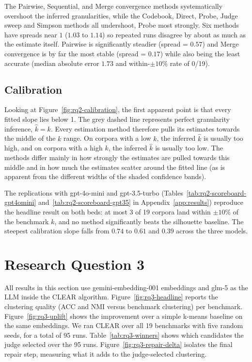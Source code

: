 \documentclass[11pt,a4paper,oneside]{report}
\begin{document}
The Pairwise, Sequential, and Merge convergence methods systematically overshoot the inferred granularities, while the Codebook, Direct, Probe, Judge sweep and Simpson methods all undershoot, Probe most strongly. Six methods have spreads near $1$ ($1.03$ to $1.14$) so repeated runs disagree by about as much as the estimate itself. Pairwise is significantly steadier (spread = $0.57$) and Merge convergence is by far the most stable (spread = $0.17$) while also being the least accurate (median absolute error $1.73$ and within-$\pm 10\%$ rate of 0/19).

\subsection{Calibration}

Looking at Figure~\ref{fig:rq2-calibration}, the first apparent point is that every fitted slope lies below 1. The grey dashed line represents perfect granularity inference, $\hat{k} = k$. Every estimation method therefore pulls its estimates towards the middle of the $k$ range. On corpora with a low $k$, the inferred $\hat{k}$ is usually too high, and on corpora with a high $k$, the inferred $\hat{k}$ is usually too low. The methods differ mainly in how strongly the estimates are pulled towards this middle and in how much the estimates scatter around the fitted line (as is apparent from the different widths of the shaded confidence bands).

The replications with {\small\ttfamily gpt-4o-mini} and
{\small\ttfamily gpt-3.5-turbo}
(Tables~\ref{tab:rq2-scoreboard-gpt4omini}
and~\ref{tab:rq2-scoreboard-gpt35} in Appendix~\ref{app:results})
reproduce the headline result on both beds: at most 3 of 19 corpora
land within $\pm 10\%$ of the benchmark $k$, and no method
significantly beats the silhouette baseline. The steepest calibration
slope falls from $0.74$ to $0.61$ and $0.39$ across the three models.

\section{Research Question 3}\label{sec:results-rq3}

All results in this section use {\small\ttfamily gemini-embedding-001} embeddings and {\small\ttfamily glm-5} as the LLM inside the CLEAR algorithm. Figure~\ref{fig:rq3-headline} reports the clustering quality (ACC and NMI versus benchmark clustering) per benchmark. Figure~\ref{fig:rq3-uplift} shows the improvement over a simple k-means baseline on the same embeddings. We ran CLEAR over all 19 benchmarks with five random seeds, for a total of 95 runs. Table~\ref{tab:rq3-winners} shows which candidates the judge selected over the 95 runs. Figure~\ref{fig:rq3-repair-delta} isolates the final repair step, measuring what it adds to the judge-selected clustering.
\end{document}
